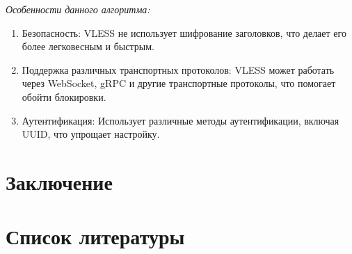 \documentclass[utf8,14pt,a4paper,oneside,russian]{book}
\begin{document}
\textit{Особенности данного алгоритма:}
\begin{enumerate}
    \item Безопасность: VLESS не использует шифрование заголовков, что делает его более легковесным и быстрым.
    \item Поддержка различных транспортных протоколов: VLESS может работать через WebSocket, gRPC и другие транспортные протоколы, что помогает обойти блокировки.
    \item Аутентификация: Использует различные методы аутентификации, включая UUID, что упрощает настройку.
\end{enumerate}


\newpage
\section{Заключение}



\newpage
\section{Список литературы}
\end{document}
